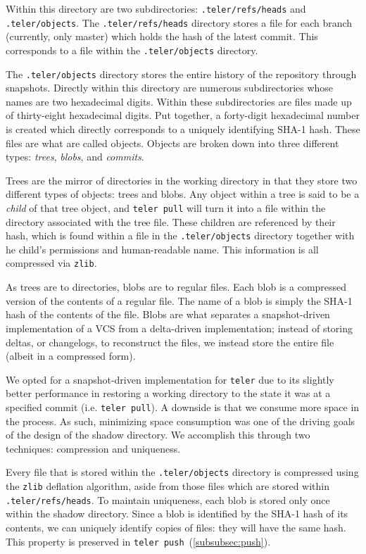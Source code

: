 \documentclass[11pt, letterpaper]{article}
\begin{document}
\begin{multicols}{2}
  Within this directory are two subdirectories:
  \texttt{.teler/refs/heads} and \texttt{.teler/objects}. The
  \texttt{.teler/refs/heads} directory stores a file for each branch
  (currently, only master) which holds the hash of the latest
  commit. This corresponds to a file within the
  \texttt{.teler/objects} directory.

  The \texttt{.teler/objects} directory stores the entire history of
  the repository through snapshots. Directly within this directory are
  numerous subdirectories whose names are two hexadecimal digits.
  Within these subdirectories are files made up of thirty-eight
  hexadecimal digits. Put together, a forty-digit hexadecimal number
  is created which directly corresponds to a uniquely identifying
  SHA-1 hash. These files are what are called objects. Objects are
  broken down into three different types: \textit{trees},
  \textit{blobs}, and \textit{commits}.

  Trees are the mirror of directories in the working directory in that
  they store two different types of objects: trees and blobs. Any
  object within a tree is said to be a \textit{child} of that tree
  object, and \texttt{teler pull} will turn it into a file within the
  directory associated with the tree file. These children
  are referenced by their hash, which is found within a file in the
  \texttt{.teler/objects} directory together with he child's permissions
  and human-readable name. This information is all compressed via
  \texttt{zlib}.

  As trees are to directories, blobs are to regular files. Each blob
  is a compressed version of the contents of a regular file. The name
  of a blob is simply the SHA-1 hash of the contents of the file.
  Blobs are what separates a snapshot-driven implementation of a VCS
  from a delta-driven implementation; instead of storing deltas, or
  changelogs, to reconstruct the files, we instead store the entire
  file (albeit in a compressed form).

  We opted for a snapshot-driven implementation for \texttt{teler} due
  to its slightly better performance in restoring a working directory
  to the state it was at a specified commit (i.e. \texttt{teler
    pull}). A downside is that we consume more space in the process. As
  such, minimizing space consumption was one of the driving goals of
  the design of the shadow directory. We accomplish this through two
  techniques: compression and uniqueness.

  Every file that is stored within the \texttt{.teler/objects}
  directory is compressed using the \texttt{zlib} deflation algorithm,
  aside from those files which are stored within
  \texttt{.teler/refs/heads}. To maintain uniqueness, each blob is
  stored only once within the shadow directory. Since a blob is
  identified by the SHA-1 hash of its contents, we can uniquely identify
  copies of files: they will have the same hash. This property is preserved
  in \texttt{teler push}~(\ref{subsubsec:push}).


\end{multicols}
\end{document}
